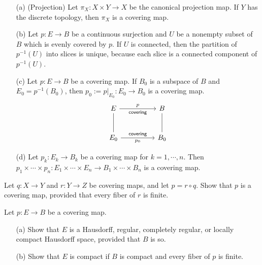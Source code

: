 \begin{exmp}
    \begin{enumerate}
        \item[(a)]
        {
            (Projection)
            Let $\pi_X: X\times Y\rightarrow X$ be the canonical projection map.
            If $Y$ has the discrete topology, then $\pi_X$ is a covering map.
        }
        \item[(b)]
        {
            Let $p: E\rightarrow B$ be a continuous surjection and $U$ be a nonempty subset of $B$ which is evenly covered by $p$.
            If $U$ is connected, then the partition of $p^{-1}(U)$ into slices is unique, because each slice is a connected component of $p^{-1}(U)$.
        }
        \item[(c)]
        {
            Let $p: E\rightarrow B$ be a covering map.
            If $B_0$ is a subspace of $B$ and $E_0=p^{-1}(B_0)$, then $p_0:=p|_{E_0}: E_0\rightarrow B_0$ is a covering map.
            \begin{equation*}
            \begin{tikzcd}[row sep=large, column sep=huge]
                E\arrow[r, "p", "\textsf{covering}"']
                \arrow[d, dash]
                &
                B
                \arrow[d, dash]
                \\
                E_0\arrow[r, "p_0"', "\textsf{covering}"]
                &
                B_0
            \end{tikzcd}
            \end{equation*}
        }
        \item[(d)]
        {
            Let $p_k: E_k\rightarrow B_k$ be a covering map for $k=1, \cdots, n$.
            Then $p_1\times\cdots\times p_n: E_1\times\cdots\times E_n\rightarrow B_1\times\cdots\times B_n$ is a covering map.
        }
    \end{enumerate}
\end{exmp}

\color{red}
\begin{prob}
    Let $q: X\rightarrow Y$ and $r: Y\rightarrow Z$ be covering maps, and let $p=r\circ q$.
    Show that $p$ is a covering map, provided that every fiber of $r$ is finite.
\end{prob}
\begin{sol}
    
\end{sol}

\begin{prob}
    Let $p: E\rightarrow B$ be a covering map.
    \begin{enumerate}
        \item[(a)]
        {
            Show that $E$ is a Hausdorff, regular, completely regular, or locally compact Hausdorff space, provided that $B$ is so.
        }
        \item[(b)]
        {
            Show that $E$ is compact if $B$ is compact and every fiber of $p$ is finite.
        }
    \end{enumerate}
\end{prob}
\begin{sol}
    
\end{sol}
\color{black}